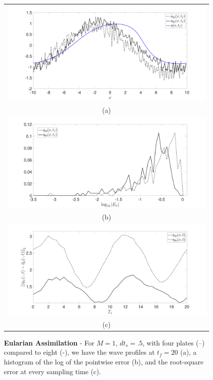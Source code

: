 \begin{figure}
\centering
\begin{tabular}{c}
\includegraphics[width=.95\textwidth]{Images/wave_tf_20_sig_pt1_4_vs8pplates_Mval_1} \\
(a)\\
\includegraphics[width=.95\textwidth]{Images/histogram_tf_20_sig_pt1_4_vs8pplates_Mval_1}\\
(b)\\
\includegraphics[width=.95\textwidth]{Images/rmserr_tf_20_sig_pt1_4_vs8pplates_Mval_1}\\
(c)
\end{tabular}
\caption{{\bf Eularian Assimilation} - For $M=1$, $dt_{s}=.5$, with four plates (--) compared to eight (-), we have the wave profiles at $t_{f}=20$ (a), a histogram of the log of the pointwise error (b), and the root-square error at every sampling time (c).} 
\label{fig:Mval_1}
\end{figure}

